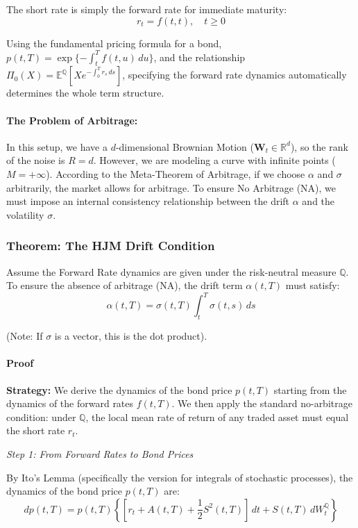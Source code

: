 \documentclass[12pt,a4paper]{article}
\theoremstyle{definition}
\newcommand{\R}{\mathbb{R}}
\newcommand{\Q}{\mathbb{Q}}
\newcommand{\E}{\mathbb{E}}
\begin{document}
The short rate is simply the forward rate for immediate maturity:
\[
r_t = f(t,t), \quad t \geq 0
\]

Using the fundamental pricing formula for a bond, $p(t,T) = \exp\{-\int_t^T f(t,u)\,du\}$, and the relationship $\Pi_0(X) = \E^{\Q}[Xe^{-\int_0^T r_s \, ds}]$, specifying the forward rate dynamics automatically determines the whole term structure.

\paragraph{The Problem of Arbitrage:} 

In this setup, we have a $d$-dimensional Brownian Motion ($\boldsymbol{W}_t \in \R^d$), so the rank of the noise is $R = d$. However, we are modeling a curve with infinite points ($M = +\infty$). According to the Meta-Theorem of Arbitrage, if we choose $\alpha$ and $\sigma$ arbitrarily, the market allows for arbitrage. To ensure No Arbitrage (NA), we must impose an internal consistency relationship between the drift $\alpha$ and the volatility $\sigma$.

\subsubsection{Theorem: The HJM Drift Condition}

Assume the Forward Rate dynamics are given under the risk-neutral measure $\Q$. To ensure the absence of arbitrage (NA), the drift term $\alpha(t,T)$ must satisfy:
\[
\alpha(t,T) = \sigma(t,T) \int_t^T \sigma(t,s)\,ds
\]

(Note: If $\sigma$ is a vector, this is the dot product).

\paragraph{Proof}

\textbf{Strategy:} We derive the dynamics of the bond price $p(t,T)$ starting from the dynamics of the forward rates $f(t,T)$. We then apply the standard no-arbitrage condition: under $\Q$, the local mean rate of return of any traded asset must equal the short rate $r_t$.

\textit{Step 1: From Forward Rates to Bond Prices}

By Ito's Lemma (specifically the version for integrals of stochastic processes), the dynamics of the bond price $p(t,T)$ are:
\[
dp(t,T) = p(t,T)\left\{[r_t + A(t,T) + \frac{1}{2}S^2(t,T)]\,dt + S(t,T)\,dW_t^{\Q}\right\}
\]
\end{document}
